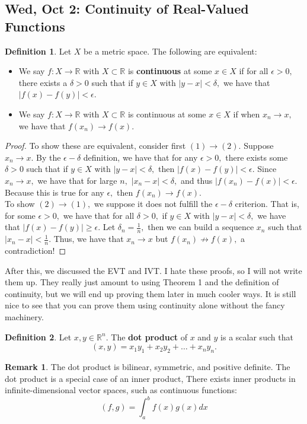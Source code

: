 \documentclass[10pt, oneside]{article}
\newcommand{\bbR}{\mathbb{R}}
\theoremstyle{definition}
\newtheorem{defn}{Definition}
\newtheorem{rem}{Remark}
\begin{document}
\newpage
\subsection{Wed, Oct 2: Continuity of Real-Valued Functions}
\begin{defn}
Let $X$ be a metric space. The following are equivalent:
\begin{itemize}
    \item We say $f: X \to \bbR$ with $X\subset \bbR$ is \textbf{continuous} at some $x\in X$ if for all $\epsilon>0,$ there exists a $\delta>0$ such that if $y \in X$ with $|y-x|< \delta,$ we have that $|f(x) - f(y) | < \epsilon.$ 
    \item We say $f: X \to \bbR$ with $X\subset \bbR$ is continuous at some $x\in X$ if when $x_n \to x,$ we have that $f(x_n) \to f(x).$
\end{itemize}
\end{defn}
\begin{proof}
    To show these are equivalent, consider first $(1)\to (2).$ Suppose $x_n \to x.$ By the $\epsilon-\delta$ definition, we have that for any $\epsilon>0,$ there exists some $\delta>0$ such that if $y \in X$ with $|y-x|< \delta,$ then $|f(x) - f(y)|< \epsilon.$ Since $x_n \to x,$ we have that for large $n,$ $|x_n - x|< \delta,$ and thus $|f(x_n) - f(x)|< \epsilon.$ Because this is true for any $\epsilon,$ then $f(x_n)\to f(x).$\\
    To show $(2)\to (1),$ we suppose it does not fulfill the $\epsilon-\delta$ criterion. That is, for some $\epsilon>0,$ we have that for all $\delta>0,$ if $y \in X$ with $|y-x|< \delta,$ we have that $|f(x)- f(y)|\geq \epsilon.$ Let $\delta_n = \frac{1}{n},$ then we can build a sequence $x_n$ such that $|x_n - x|< \frac{1}{n}.$ Thus, we have that $x_n \to x$ but $f(x_n)\not \to f(x),$ a contradiction!
\end{proof}
After this, we discussed the EVT and IVT. I hate these proofs, so I will not write them up. They really just amount to using Theorem 1 and the definition of continuity, but we will end up proving them later in much cooler ways. It is still nice to see that you can prove them using continuity alone without the fancy machinery.
\begin{defn}
    Let $x,y \in \bbR^n.$ The \textbf{dot product} of $x$ and $y$ is a scalar such that 
    \[( x, y ) = x_1y_1 + x_2y_2 + \dots + x_ny_n.\]
\end{defn}
\begin{rem}
    The dot product is bilinear, symmetric, and positive definite. The dot product is a special case of an inner product, There exists inner products in infinite-dimensional vector spaces, such as continuous functions:
    \[( f,g ) = \int_a^b f(x)g(x)dx\]
\end{rem}
\end{document}
